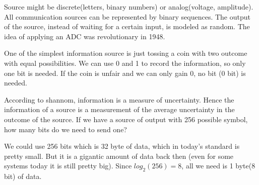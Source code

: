 \documentclass{article}
\newlength\tindent
\renewcommand{\indent}{\hspace*{\tindent}}
\begin{document}
    Source might be discrete(letters, binary numbers) or analog(voltage, amplitude).
    All communication sources can be represented by binary sequences. 
    The output of the source, instead of waiting for a certain input, is modeled as random.
    The idea of applying an ADC was revolutionary in 1948. \\\indent

    One of the simplest information source is just tossing a coin with two outcome with equal possibilities.
    We can use 0 and 1 to record the information, so only one bit is needed. 
    If the coin is unfair and we can only gain 0, no bit (0 bit) is needed.\\\indent

    According to shannom, information is a measure of uncertainty. 
    Hence the information of a source is a measurement of the average uncertainty in the outcome of the source.
    If we have a source of output with 256 possible symbol, how many bits do we need to send one?\\\indent

    We could use 256 bits which is 32 byte of data, which in today's standard is pretty small.
    But it is a gigantic amount of data back then (even for some systems today it is still pretty big).
    Since $log_{2}(256) = 8$, all we need is 1 byte(8 bit) of data.\\\indent
\end{document}
